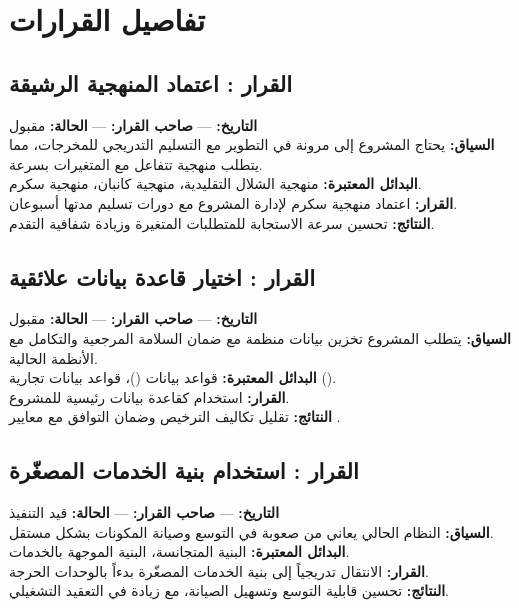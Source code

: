 \documentclass[11pt,a4paper]{article}
\begin{document}
\section{تفاصيل القرارات}
\label{sec:details}


\subsection{القرار : اعتماد المنهجية الرشيقة}
\noindent\textbf{التاريخ:} --- \quad \textbf{صاحب القرار:} --- \quad \textbf{الحالة:} مقبول \\[0.5em]
\textbf{السياق:} يحتاج المشروع إلى مرونة في التطوير مع التسليم التدريجي للمخرجات، مما يتطلب منهجية تتفاعل مع المتغيرات بسرعة. \\[0.3em]
\textbf{البدائل المعتبرة:} منهجية الشلال التقليدية، منهجية كانبان، منهجية سكرم. \\[0.3em]
\textbf{القرار:} اعتماد منهجية سكرم لإدارة المشروع مع دورات تسليم مدتها أسبوعان. \\[0.3em]
\textbf{النتائج:} تحسين سرعة الاستجابة للمتطلبات المتغيرة وزيادة شفافية التقدم.

\subsection{القرار : اختيار قاعدة بيانات علائقية}
\noindent\textbf{التاريخ:} --- \quad \textbf{صاحب القرار:} --- \quad \textbf{الحالة:} مقبول \\[0.5em]
\textbf{السياق:} يتطلب المشروع تخزين بيانات منظمة مع ضمان السلامة المرجعية والتكامل مع الأنظمة الحالية. \\[0.3em]
\textbf{البدائل المعتبرة:} قواعد بيانات  ()، قواعد بيانات تجارية (). \\[0.3em]
\textbf{القرار:} استخدام  كقاعدة بيانات رئيسية للمشروع. \\[0.3em]
\textbf{النتائج:} تقليل تكاليف الترخيص وضمان التوافق مع معايير .

\subsection{القرار : استخدام بنية الخدمات المصغّرة}
\noindent\textbf{التاريخ:} --- \quad \textbf{صاحب القرار:} --- \quad \textbf{الحالة:} قيد التنفيذ \\[0.5em]
\textbf{السياق:} النظام الحالي يعاني من صعوبة في التوسع وصيانة المكونات بشكل مستقل. \\[0.3em]
\textbf{البدائل المعتبرة:} البنية المتجانسة، البنية الموجهة بالخدمات. \\[0.3em]
\textbf{القرار:} الانتقال تدريجياً إلى بنية الخدمات المصغّرة بدءاً بالوحدات الحرجة. \\[0.3em]
\textbf{النتائج:} تحسين قابلية التوسع وتسهيل الصيانة، مع زيادة في التعقيد التشغيلي.
\end{document}
